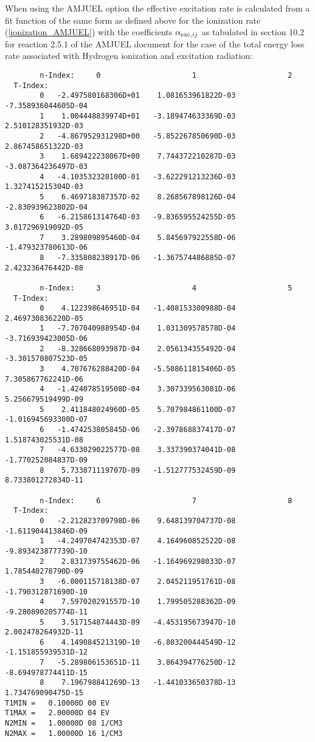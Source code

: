 \documentclass[amsmath,amssymb,a4]{revtex4}
\begin{document}
When using the AMJUEL option the effective excitation rate is calculated from a fit function of the same form as defined above for the ionization rate (\ref{ionization_AMJUEL}) with the coefficients $\alpha_{{\rm exc,} ij}$ as tabulated in section 10.2 for reaction 2.5.1 of the AMJUEL document for the case of the total energy loss rate associated with Hydrogen ionization and excitation radiation:
\begin{small}\begin{verbatim}
        n-Index:     0                     1                     2
  T-Index:
        0   -2.497580168306D+01    1.081653961822D-03   -7.358936044605D-04
        1    1.004448839974D+01   -3.189474633369D-03    2.510128351932D-03
        2   -4.867952931298D+00   -5.852267850690D-03    2.867458651322D-03
        3    1.689422238067D+00    7.744372210287D-03   -3.087364236497D-03
        4   -4.103532320100D-01   -3.622291213236D-03    1.327415215304D-03
        5    6.469718387357D-02    8.268567898126D-04   -2.830939623802D-04
        6   -6.215861314764D-03   -9.836595524255D-05    3.017296919092D-05
        7    3.289809895460D-04    5.845697922558D-06   -1.479323780613D-06
        8   -7.335808238917D-06   -1.367574486885D-07    2.423236476442D-08

        n-Index:     3                     4                     5
  T-Index:
        0    4.122398646951D-04   -1.408153300988D-04    2.469730836220D-05
        1   -7.707040988954D-04    1.031309578578D-04   -3.716939423005D-06
        2   -8.328668093987D-04    2.056134355492D-04   -3.301570807523D-05
        3    4.707676288420D-04   -5.508611815406D-05    7.305867762241D-06
        4   -1.424078519508D-04    3.307339563081D-06    5.256679519499D-09
        5    2.411848024960D-05    5.707984861100D-07   -1.016945693300D-07
        6   -1.474253805845D-06   -2.397868837417D-07    1.518743025531D-08
        7   -4.633029022577D-08    3.337390374041D-08   -1.770252084837D-09
        8    5.733871119707D-09   -1.512777532459D-09    8.733801272834D-11

        n-Index:     6                     7                     8
  T-Index:
        0   -2.212823709798D-06    9.648139704737D-08   -1.611904413846D-09
        1   -4.249704742353D-07    4.164960852522D-08   -9.893423877739D-10
        2    2.831739755462D-06   -1.164969298033D-07    1.785440278790D-09
        3   -6.000115718138D-07    2.045211951761D-08   -1.790312871690D-10
        4    7.597020291557D-10    1.799505288362D-09   -9.280890205774D-11
        5    3.517154874443D-09   -4.453195673947D-10    2.002478264932D-11
        6    4.149084521319D-10   -6.803200444549D-12   -1.151855939531D-12
        7   -5.289806153651D-11    3.864394776250D-12   -8.694978774411D-15
        8    7.196798841269D-13   -1.441033650378D-13    1.734769090475D-15
T1MIN =   0.10000D 00 EV
T1MAX =   2.00000D 04 EV
N2MIN =   1.00000D 08 1/CM3
N2MAX =   1.00000D 16 1/CM3
\end{verbatim}\end{small}
\end{document}
